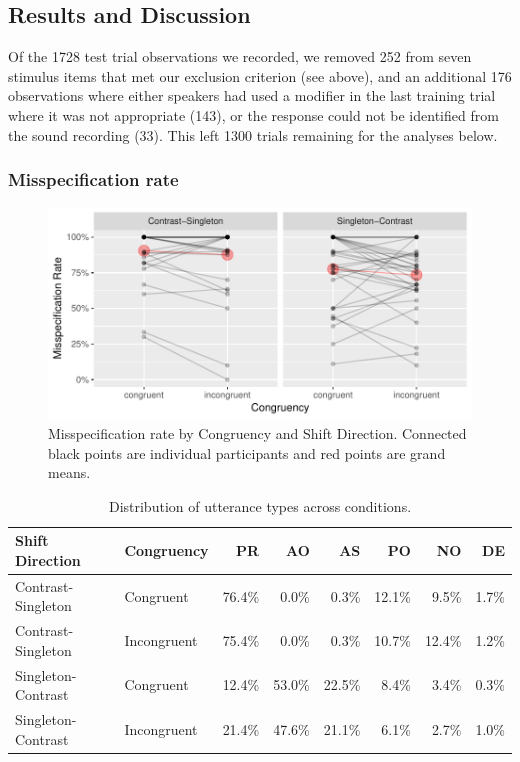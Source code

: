 \documentclass[natbib,doc,a4paper]{apa6}
\begin{document}
\subsection*{Results and Discussion}
\label{sec:org4fecaf7}

Of the 1728 test trial observations we recorded, we removed 252 from seven stimulus items that met our exclusion criterion (see above), and an additional 176 observations where either speakers had used a modifier in the last training trial where it was not appropriate (143), or the response could not be identified from the sound recording (33). This left 1300 trials remaining for the analyses below.

\subsubsection*{Misspecification rate}
\label{sec:org08d157e}

\begin{figure}[htbp]
\centering
\includegraphics[width=.9\linewidth]{exp2/img/exp2-misrate-plot.pdf}
\caption{\label{fig:org3447ca0}
Misspecification rate by Congruency and Shift Direction. Connected black points are individual participants and red points are grand means.}
\end{figure}

\begin{table}[ht]
\centering
\caption{Distribution of utterance types across conditions.} 
\label{tbl:exp2-utt-dist}
\begin{tabular}{llrrrrrr}
  \hline
Shift Direction & Congruency & PR & AO & AS & PO & NO & DE \\ 
  \hline
Contrast-Singleton & Congruent & 76.4\% & 0.0\% & 0.3\% & 12.1\% & 9.5\% & 1.7\% \\ 
  Contrast-Singleton & Incongruent & 75.4\% & 0.0\% & 0.3\% & 10.7\% & 12.4\% & 1.2\% \\ 
  Singleton-Contrast & Congruent & 12.4\% & 53.0\% & 22.5\% & 8.4\% & 3.4\% & 0.3\% \\ 
  Singleton-Contrast & Incongruent & 21.4\% & 47.6\% & 21.1\% & 6.1\% & 2.7\% & 1.0\% \\ 
   \hline
\end{tabular}
\end{table}
\end{document}
